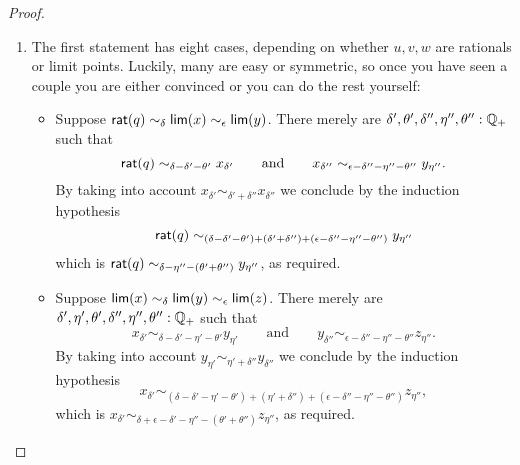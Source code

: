 \begin{proof}
  \mbox{}
  \begin{enumerate}
  \item The first statement has eight cases, depending on whether $u, v, w$ are rationals
    or limit points. Luckily, many are easy or symmetric, so once you have seen a couple
    you are either convinced or you can do the rest yourself:
    \begin{itemize}
    \item Suppose $\mathsf{rat}(q) \sim_\delta \mathsf{lim}(x) \sim_\epsilon \mathsf{lim}(y)$. There merely are
      $\delta', \theta', \delta'', \eta'', \theta'' : \mathbb{Q}_{+}$ such that
      \begin{equation*}
        \mathsf{rat}(q)
        \sim_{\delta - \delta' - \theta'}
        x_{\delta'}
        \qquad\text{and}\qquad
        x_{\delta''}
        \sim_{\epsilon - \delta'' - \eta'' - \theta''}
        y_{\eta''}.
      \end{equation*}
      By taking into account $x_{\delta'} \sim_{\delta' + \delta''} x_{\delta''}$ we
      conclude by the induction hypothesis
      \begin{equation*}
        \mathsf{rat}(q) \sim_{(\delta - \delta' - \theta') + (\delta' + \delta'') + (\epsilon -
          \delta'' - \eta'' - \theta'')} y_{\eta''}
      \end{equation*}
      which is $\mathsf{rat}(q) \sim_{\delta - \eta'' - (\theta' + \theta'')} y_{\eta''}$, as required.
    \item Suppose $\mathsf{lim}(x) \sim_\delta \mathsf{lim}(y) \sim_\epsilon \mathsf{lim}(z)$. There merely are
      $\delta', \eta', \theta', \delta'', \eta'', \theta'' : \mathbb{Q}_{+}$ such that
      \begin{equation*}
        x_{\delta'} \sim_{\delta - \delta' - \eta' - \theta'} y_{\eta'}
        \qquad\text{and}\qquad
        y_{\delta''} \sim_{\epsilon - \delta'' - \eta'' - \theta''} z_{\eta''}.
      \end{equation*}
      By taking into account $y_{\eta'} \sim_{\eta' + \delta''} y_{\delta''}$ we conclude
      by the induction hypothesis
      \begin{equation*}
        x_{\delta'} \sim_{(\delta - \delta' - \eta' - \theta') + (\eta' + \delta'') +
          (\epsilon - \delta'' - \eta'' - \theta'')} z_{\eta''},
      \end{equation*}
      which is $x_{\delta'} \sim_{\delta + \epsilon - \delta' - \eta'' - (\theta' +
        \theta'')} z_{\eta''}$, as required.      

\end{itemize}
\end{enumerate}
\end{proof}
